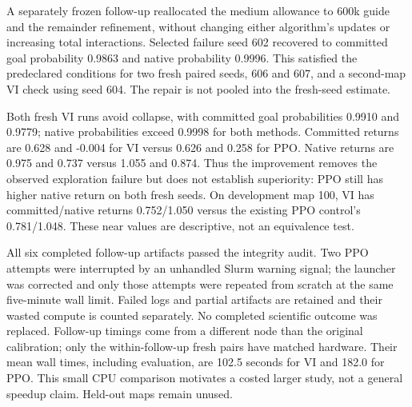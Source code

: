 

A separately frozen follow-up reallocated the medium allowance to 600k guide
and the remainder refinement, without changing either algorithm's updates or
increasing total interactions. Selected failure seed 602 recovered to committed
goal probability 0.9863 and native probability 0.9996. This satisfied the
predeclared conditions for two fresh paired seeds, 606 and 607, and a second-map
VI check using seed 604. The repair is not pooled into the fresh-seed estimate.

Both fresh VI runs avoid collapse, with committed goal probabilities 0.9910
and 0.9779; native probabilities exceed 0.9998 for both methods. Committed
returns are 0.628 and -0.004 for VI versus 0.626 and 0.258 for PPO. Native
returns are 0.975 and 0.737 versus 1.055 and 0.874. Thus the improvement removes
the observed exploration failure but does not establish superiority: PPO still
has higher native return on both fresh seeds. On development map 100, VI has
committed/native returns 0.752/1.050 versus the existing PPO control's
0.781/1.048. These near values are descriptive, not an equivalence test.

All six completed follow-up artifacts passed the integrity audit. Two PPO
attempts were interrupted by an unhandled Slurm warning signal; the launcher
was corrected and only those attempts were repeated from scratch at the same
five-minute wall limit. Failed logs and partial artifacts are retained and
their wasted compute is counted separately. No completed scientific outcome
was replaced. Follow-up timings come from a different node than the original
calibration; only the within-follow-up fresh pairs have matched hardware.
Their mean wall times, including evaluation, are 102.5 seconds for VI and
182.0 for PPO. This small CPU comparison motivates a costed larger study,
not a general speedup claim. Held-out maps remain unused.


